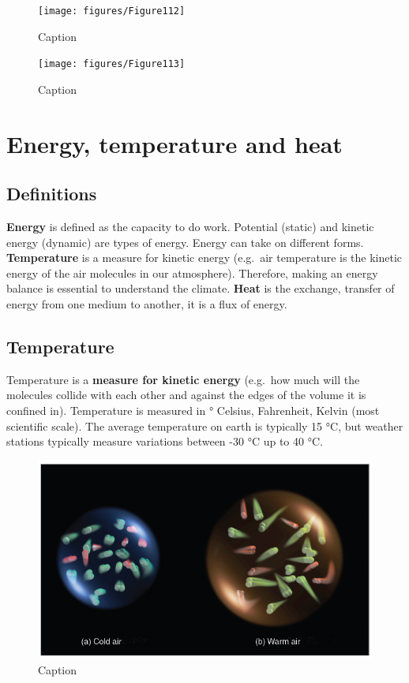 \documentclass[oneside]{book}
\begin{document}
\begin{figure}

{\centering \texttt{[image: figures/Figure112]} 

}

\caption{Caption}\label{fig:Land}
\end{figure}

\begin{figure}

{\centering \texttt{[image: figures/Figure113]} 

}

\caption{Caption}\label{fig:Land2}
\end{figure}

\section{Energy, temperature and
heat}\label{energy-temperature-and-heat}

\subsection{Definitions}\label{definitions}

\textbf{Energy} is defined as the capacity to do work. Potential
(static) and kinetic energy (dynamic) are types of energy. Energy can
take on different forms. \textbf{Temperature} is a measure for kinetic
energy (e.g.~air temperature is the kinetic energy of the air molecules
in our atmosphere). Therefore, making an energy balance is essential to
understand the climate. \textbf{Heat} is the exchange, transfer of
energy from one medium to another, it is a flux of energy.

\subsection{Temperature}\label{temperature}

Temperature is a \textbf{measure for kinetic energy} (e.g.~how much will
the molecules collide with each other and against the edges of the
volume it is confined in). Temperature is measured in ° Celsius,
Fahrenheit, Kelvin (most scientific scale). The average temperature on
earth is typically 15 °C, but weather stations typically measure
variations between -30 °C up to 40 °C.

\begin{figure}

{\centering \includegraphics[width=0.5\linewidth]{figures/Figure114} 

}

\caption{Caption}\label{fig:Temperature}
\end{figure}
\end{document}
